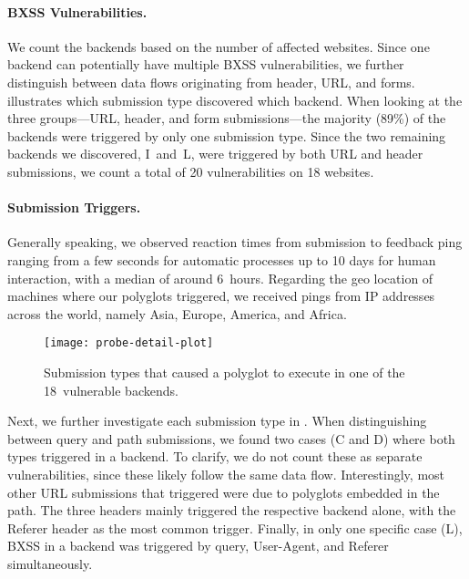 \vspace{-1em}\paragraph{BXSS Vulnerabilities.}
We count the backends based on the number of affected websites.
Since one backend can potentially have multiple BXSS vulnerabilities, we further distinguish between data flows originating from header, URL, and forms.
 illustrates which submission type discovered which backend.
When looking at the three groups---URL, header, and form submissions---the majority (\num{89}\%) of the backends were triggered by only one submission type.
Since the two remaining backends we discovered, I~and~L, were triggered by both URL and header submissions, we count a total of \num{20} \blindxss{} vulnerabilities on \num{18} websites.



\vspace{-1em}%
\paragraph{Submission Triggers.}
Generally speaking, we observed reaction times from submission to feedback ping ranging from a few seconds for automatic processes up to \num{10} days for human interaction, with a median of around \num{6}~hours.
Regarding the geo location of machines where our polyglots triggered, we received pings from IP addresses across the world, namely Asia, Europe, America, and Africa.

\begin{figure}[htb]
    \centering
    \texttt{[image: probe-detail-plot]}
    \caption{
    	Submission types that caused a polyglot to execute in one of the \num{18}~vulnerable backends.
    }%
    \vspace{-1em}
    \label{fig:bxss-trigger-plot}
\end{figure}

Next, we further investigate each submission type in .
When distinguishing between query and path submissions, we found two cases (C and D) where both types triggered in a backend.
To clarify, we do not count these as separate vulnerabilities, since these likely follow the same data flow.
Interestingly, most other URL submissions that triggered \blindxss{} were due to polyglots embedded in the path.
The three headers mainly triggered the respective backend alone, with the Referer header as the most common trigger.
Finally, in only one specific case (L), BXSS in a backend was triggered by query, User-Agent, and Referer simultaneously.

